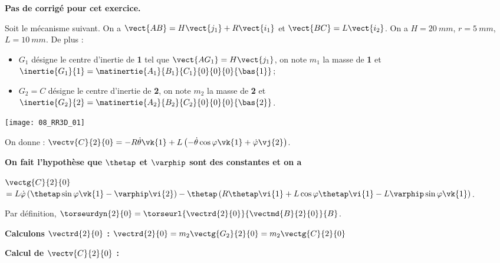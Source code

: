 \normalfalse \difficiletrue \tdifficilefalse
\correctionfalse


\setcounter{numques}{0}
\ifcorrection
\else
\textbf{Pas de corrigé pour cet exercice.}
\fi

\ifprof
\else
Soit le mécanisme suivant. On a $\vect{AB}=H\vect{j_1}+R\vect{i_1}$ et $\vect{BC}=L\vect{i_2}$. On a $H=\SI{20}{mm}$, $r=\SI{5}{mm}$, $L=\SI{10}{mm}$. De plus :
\begin{itemize}
\item $G_1$ désigne le centre d'inertie de \textbf{1} tel que $\vect{AG_1}=H\vect{j_1}$, on note $m_1$ la masse de \textbf{1} et $\inertie{G_1}{1}=\matinertie{A_1}{B_1}{C_1}{0}{0}{0}{\bas{1}}$; 
\item $G_2=C$ désigne le centre d'inertie de \textbf{2}, on note $m_2$ la masse de \textbf{2} et $\inertie{G_2}{2}=\matinertie{A_2}{B_2}{C_2}{0}{0}{0}{\bas{2}}$.
\end{itemize}
\begin{center}
\texttt{[image: 08\_RR3D\_01]}
\end{center}

On donne : 
$\vectv{C}{2}{0} = -R\dot{\theta}\vk{1}+L\left(-\dot{\theta}\cos\varphi\vk{1} + \dot{\varphi}\vj{2}\right)$.

\textbf{On fait l'hypothèse que $\thetap$ et $\varphip$ sont des constantes et on a }

$\vectg{C}{2}{0} $
$ =L\dot{\varphi}\left(\thetap\sin\varphi\vk{1}-\varphip\vi{2}\right)
-\thetap\left( R \thetap\vi{1} +L\cos\varphi \thetap\vi{1}
-L\varphip\sin\varphi\vk{1}\right)
$.





\fi

\ifprof


Par définition, $\torseurdyn{2}{0} = \torseurl{\vectrd{2}{0}}{\vectmd{B}{2}{0}}{B}$.

\textbf{Calculons $\vectrd{2}{0}$ : } 
$\vectrd{2}{0} = m_2\vectg{G_2}{2}{0}=m_2 \vectg{C}{2}{0} $

\textbf{Calcul de $\vectv{C}{2}{0}$ : }  

